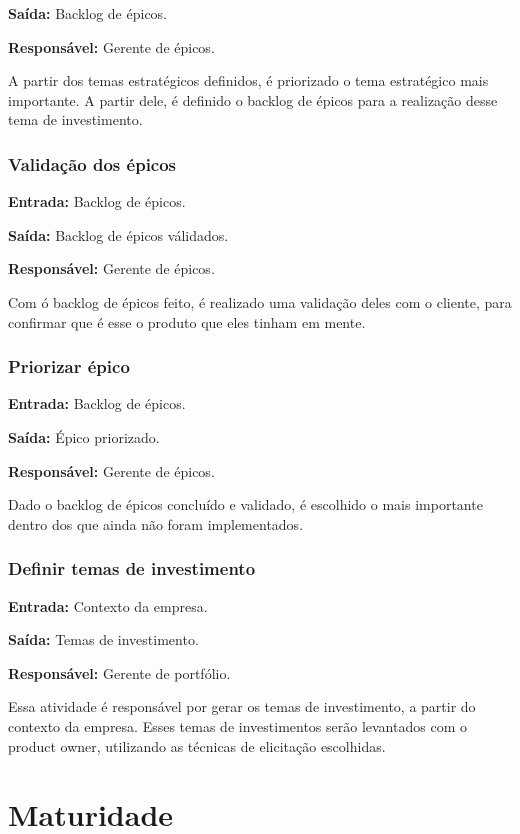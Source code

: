     \textbf{Saída:} Backlog de épicos.

    \textbf{Responsável:} Gerente de épicos.
    
    A partir dos temas estratégicos definidos, é priorizado o tema estratégico mais importante. A partir dele, é definido o backlog de épicos para a realização desse tema de investimento.

  \subsubsection{Validação dos épicos}
    \textbf{Entrada:} Backlog de épicos.

    \textbf{Saída:} Backlog de épicos válidados.

    \textbf{Responsável:} Gerente de épicos.
    
    Com ó backlog de épicos feito, é realizado uma validação deles com o cliente, para confirmar que é esse o produto que eles tinham em mente.

  \subsubsection{Priorizar épico}
    \textbf{Entrada:} Backlog de épicos.

    \textbf{Saída:} Épico priorizado.

    \textbf{Responsável:} Gerente de épicos.
    
    Dado o backlog de épicos concluído e validado, é escolhido o mais importante dentro dos que ainda não foram implementados.

  \subsubsection{Definir temas de investimento}
    \textbf{Entrada:} Contexto da empresa.

    \textbf{Saída:} Temas de investimento.

    \textbf{Responsável:} Gerente de portfólio.
    
    Essa atividade é responsável por gerar os temas de investimento, a partir do contexto da empresa. Esses temas de investimentos serão levantados com o product owner, utilizando as técnicas de elicitação escolhidas.

\section{Maturidade}

